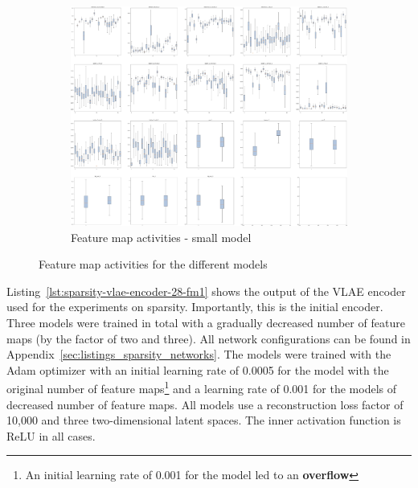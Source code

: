 \begin{figure}
    \ContinuedFloat
    \centering
    \begin{subfigure}{.95\textwidth}
        \centering
        \includegraphics[width=\textwidth]{images/sparseness/encoder_fm3_fms.png}
        \caption{Feature map activities - small model}
    \end{subfigure}
    \caption{Feature map activities for the different models}
    \label{fig:fm_activities_sparseness}
\end{figure}

Listing~\ref{lst:sparsity-vlae-encoder-28-fm1} shows the output of the \ac{VLAE} encoder used for the experiments on sparsity.
Importantly, this is the initial encoder.
Three models were trained in total with a gradually decreased number of feature maps (by the factor of two and three).
All network configurations can be found in Appendix~\ref{sec:listings_sparsity_networks}.
The models were trained with the Adam optimizer with an initial learning rate of 0.0005 for the model with the original number of feature maps\footnote{An initial learning rate of 0.001 for the  model led to an \textbf{overflow}} and a learning rate of 0.001 for the models of decreased number of feature maps.
All models use a reconstruction loss factor of 10,000 and three two-dimensional latent spaces.
The inner activation function is ReLU in all cases.

